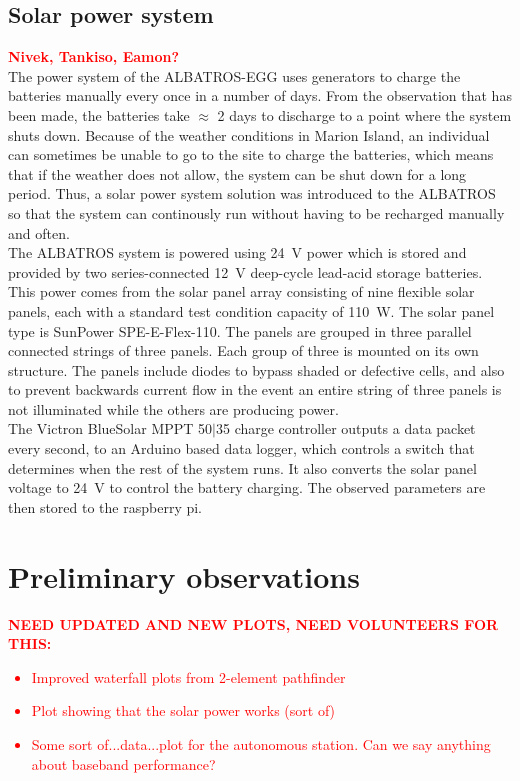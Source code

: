 \documentclass{ws-jai}
\begin{document}
\subsection{Solar power system}
\textcolor{red}{\bf Nivek, Tankiso, Eamon?} \\
The power system of the ALBATROS-EGG uses generators to charge the batteries manually every once in a number of days. From the observation that has been made, the batteries take $\approx$ 2 days to discharge to a point where the system shuts down. Because of the weather conditions in Marion Island, an individual can sometimes be unable to go to the site to charge the batteries, which means that if the weather does not allow, the system can be shut down for a long period. Thus, a solar power system solution was introduced to the ALBATROS so that the system can continously run without having to be recharged manually and often.\\

The ALBATROS system is powered using \SI{24}{\volt} power which is stored and provided by two series-connected \SI{12}{\volt} deep-cycle lead-acid storage batteries. This power comes from the solar panel array consisting of nine flexible solar panels, each with a standard test condition capacity of \SI{110}{\watt}. The solar panel type is SunPower SPE-E-Flex-110. The panels are grouped in three parallel connected strings of three panels. Each group of three is mounted on its own structure. The panels include diodes to bypass shaded or defective cells, and also to prevent backwards current flow in the event an entire string of three panels is not illuminated while the others are producing power. \\

The Victron BlueSolar MPPT 50$\vert$35 charge controller outputs a data packet every second, to an Arduino based data logger, which controls a switch that determines when the rest of the system runs. It also converts the solar panel voltage to \SI{24}{\volt} to control the battery charging. The observed parameters are then stored to the raspberry pi.

\section{Preliminary observations}

\textcolor{red}{\bf NEED UPDATED AND NEW PLOTS, NEED VOLUNTEERS FOR THIS:
  \begin{itemize}
    \item{Improved waterfall plots from 2-element pathfinder}
    \item{Plot showing that the solar power works (sort of)}
    \item{Some sort of...data...plot for the autonomous station.  Can
      we say anything about baseband performance?}
  \end{itemize}
}
 
\end{document}
